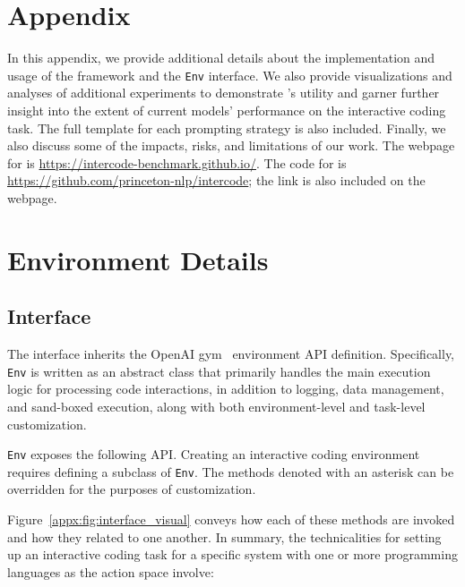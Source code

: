 \section*{Appendix}
\label{appx:intro}
In this appendix, we provide additional details about the implementation and usage of the \benchmark{} framework and the \texttt{\benchmark{}Env} interface. We also provide visualizations and analyses of additional experiments to demonstrate \benchmark{}'s utility and garner further insight into the extent of current models' performance on the interactive coding task. The full template for each prompting strategy is also included. Finally, we also discuss some of the impacts, risks, and limitations of our work. The webpage for \benchmark{} is \url{https://intercode-benchmark.github.io/}. The code for \benchmark{} is \url{https://github.com/princeton-nlp/intercode}; the link is also included on the \benchmark{} webpage.

\section{Environment Details}
\label{appx:env}

\subsection{\benchmark{} Interface}
\label{appx:env:interface}
The \benchmark{} interface inherits the OpenAI gym~\cite{openai_gym} environment API definition. 
Specifically, \texttt{\benchmark{}Env} is written as an abstract class that primarily handles the main execution logic for processing code interactions, in addition to logging, data management, and sand-boxed execution, along with both environment-level and task-level customization. 

\texttt{\benchmark{}Env} exposes the following API. Creating an interactive coding environment requires defining a subclass of \texttt{\benchmark{}Env}. The methods denoted with an asterisk can be overridden for the purposes of customization.





Figure~\ref{appx:fig:interface_visual} conveys how each of these methods are invoked and how they related to one another. In summary, the technicalities for setting up an interactive coding task for a specific system with one or more programming languages as the action space involve:

